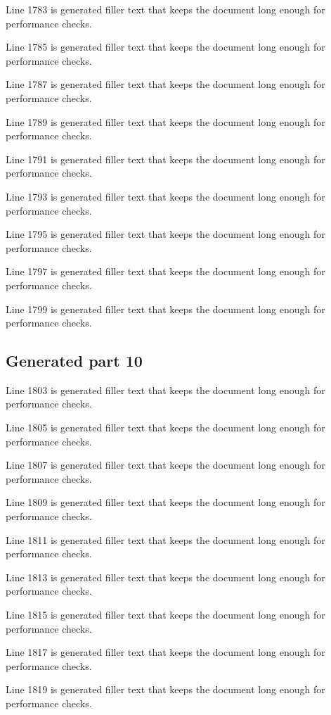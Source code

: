 Line 1783 is generated filler text that keeps the document long enough for performance checks.

Line 1785 is generated filler text that keeps the document long enough for performance checks.

Line 1787 is generated filler text that keeps the document long enough for performance checks.

Line 1789 is generated filler text that keeps the document long enough for performance checks.

Line 1791 is generated filler text that keeps the document long enough for performance checks.

Line 1793 is generated filler text that keeps the document long enough for performance checks.

Line 1795 is generated filler text that keeps the document long enough for performance checks.

Line 1797 is generated filler text that keeps the document long enough for performance checks.

Line 1799 is generated filler text that keeps the document long enough for performance checks.

\subsection{Generated part 10}

Line 1803 is generated filler text that keeps the document long enough for performance checks.

Line 1805 is generated filler text that keeps the document long enough for performance checks.

Line 1807 is generated filler text that keeps the document long enough for performance checks.

Line 1809 is generated filler text that keeps the document long enough for performance checks.

Line 1811 is generated filler text that keeps the document long enough for performance checks.

Line 1813 is generated filler text that keeps the document long enough for performance checks.

Line 1815 is generated filler text that keeps the document long enough for performance checks.

Line 1817 is generated filler text that keeps the document long enough for performance checks.

Line 1819 is generated filler text that keeps the document long enough for performance checks.

